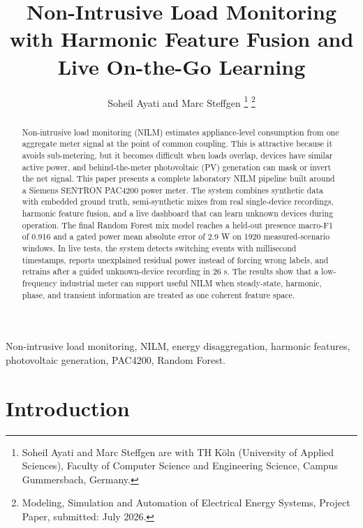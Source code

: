 \documentclass[letterpaper,journal]{IEEEtran}
\begin{document}
\title{Non-Intrusive Load Monitoring with Harmonic Feature Fusion and Live On-the-Go Learning}

\author{Soheil Ayati and Marc Steffgen%
\thanks{Soheil Ayati and Marc Steffgen are with TH K\"oln (University of Applied Sciences), Faculty of Computer Science and Engineering Science, Campus Gummersbach, Germany.}%
\thanks{Modeling, Simulation and Automation of Electrical Energy Systems, Project Paper, submitted: July 2026.}%
}

\maketitle

\begin{abstract}
Non-intrusive load monitoring (NILM) estimates appliance-level consumption from one aggregate meter signal at the point of common coupling. This is attractive because it avoids sub-metering, but it becomes difficult when loads overlap, devices have similar active power, and behind-the-meter photovoltaic (PV) generation can mask or invert the net signal. This paper presents a complete laboratory NILM pipeline built around a Siemens SENTRON PAC4200 power meter. The system combines synthetic data with embedded ground truth, semi-synthetic mixes from real single-device recordings, harmonic feature fusion, and a live dashboard that can learn unknown devices during operation. The final Random Forest mix model reaches a held-out presence macro-F1 of 0.916 and a gated power mean absolute error of 2.9 W on 1920 measured-scenario windows. In live tests, the system detects switching events with millisecond timestamps, reports unexplained residual power instead of forcing wrong labels, and retrains after a guided unknown-device recording in 26 s. The results show that a low-frequency industrial meter can support useful NILM when steady-state, harmonic, phase, and transient information are treated as one coherent feature space.
\end{abstract}

\begin{IEEEkeywords}
Non-intrusive load monitoring, NILM, energy disaggregation, harmonic features, photovoltaic generation, PAC4200, Random Forest.
\end{IEEEkeywords}

\section{Introduction}
\end{document}

